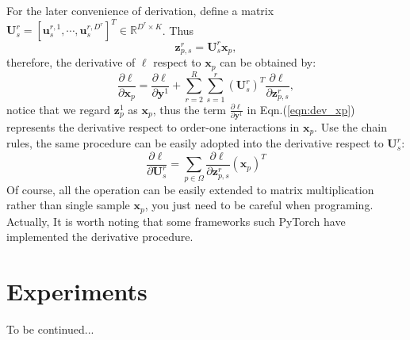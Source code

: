 \documentclass[a4paper,4pt]{article}
\begin{document}
For the later convenience of derivation, define a matrix 
$\bm{U}^r_s=[\bm{u}_s^{r,1},\cdots,\bm{u}_s^{r,D^r}]^T \in \mathbb{R}^{D^r\times K}$.
Thus 
\begin{equation}
    \bm{z}^r_{p,s}=\bm{U}_s^r\bm{x}_p,
\end{equation}
therefore, the derivative of $\ell$ respect to $\bm{x}_p$ can be obtained by:
\begin{equation}\label{eqn:dev_xp}
    \frac{\partial \ell}{\partial \bm{x}_p}
    =\frac{\partial \ell}{\partial \bm{y}^1}
    +\sum_{r=2}^R \sum_{s=1}^r (\bm{U}^r_s)^T \frac{\partial \ell}{\partial \bm{z}^r_{p,s}},
\end{equation}
notice that we regard $\bm{z}^1_p$ as $\bm{x}_p$, thus the term $\frac{\partial \ell}{\partial \bm{y}^1}$ 
in Eqn.(\ref{eqn:dev_xp}) represents the derivative respect to order-one interactions in $\bm{x}_p$.
Use the chain rules, the same procedure can be easily adopted into the derivative respect to
$\bm{U}^r_s$:
\begin{equation}
    \frac{\partial \ell}{\partial \bm{U}^r_s} 
    =\sum_{p\in \Omega}
    \frac{\partial \ell}{\partial \bm{z}^r_{p,s}} (\bm{x}_p)^T
\end{equation}
Of course, all the operation can be easily extended to matrix multiplication rather
than single sample $\bm{x}_p$, you just need to be careful when programing. Actually,
It is worth noting that some frameworks such PyTorch have implemented the derivative procedure.
\section{Experiments}
To be continued...
{}

\end{document}
